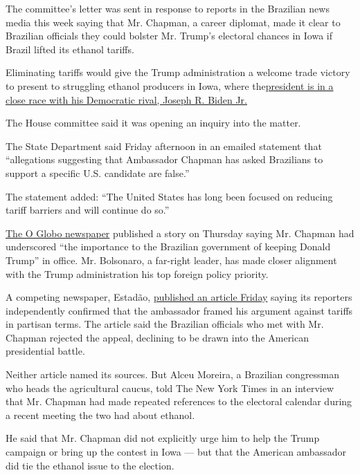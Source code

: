 The committee's letter was sent in response to reports in the Brazilian
news media this week saying that Mr. Chapman, a career diplomat, made it
clear to Brazilian officials they could bolster Mr. Trump's electoral
chances in Iowa if Brazil lifted its ethanol tariffs.

Eliminating tariffs would give the Trump administration a welcome trade
victory to present to struggling ethanol producers in Iowa, where
the\href{https://www.nytimes3xbfgragh.onion/2020/06/20/us/politics/iowa-polls-trump-biden-ernst-greenfield.html}{president
is in a close race with his Democratic rival, Joseph R. Biden Jr.}

The House committee said it was opening an inquiry into the matter.

The State Department said Friday afternoon in an emailed statement that
``allegations suggesting that Ambassador Chapman has asked Brazilians to
support a specific U.S. candidate are false.''

The statement added: ``The United States has long been focused on
reducing tariff barriers and will continue do so.''

\href{https://blogs.oglobo.globo.com/lauro-jardim/post/embaixador-dos-eua-faz-lobby-no-governo-por-etanol-americano.html}{The
O Globo newspaper} published a story on Thursday saying Mr. Chapman had
underscored ``the importance to the Brazilian government of keeping
Donald Trump'' in office. Mr. Bolsonaro, a far-right leader, has made
closer alignment with the Trump administration his top foreign policy
priority.

A competing newspaper, Estadão,
\href{https://economia.estadao.com.br/noticias/geral,embaixador-dos-eua-pede-isencao-para-etanol-americano-mas-governo-diz-que-nao-tem-cabimento,70003381539}{published
an article Friday} saying its reporters independently confirmed that the
ambassador framed his argument against tariffs in partisan terms. The
article said the Brazilian officials who met with Mr. Chapman rejected
the appeal, declining to be drawn into the American presidential battle.

Neither article named its sources. But Alceu Moreira, a Brazilian
congressman who heads the agricultural caucus, told The New York Times
in an interview that Mr. Chapman had made repeated references to the
electoral calendar during a recent meeting the two had about ethanol.

He said that Mr. Chapman did not explicitly urge him to help the Trump
campaign or bring up the contest in Iowa --- but that the American
ambassador did tie the ethanol issue to the election.

